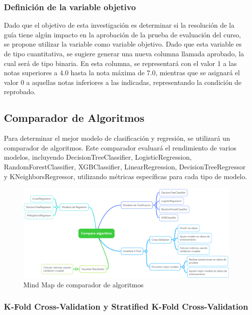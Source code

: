 \subsubsection{Definición de la variable objetivo}

Dado que el objetivo de esta investigación es determinar si la resolución de la guía tiene algún impacto en la aprobación de la prueba de evaluación del curso, se propone utilizar la variable  como variable objetivo. Dado que esta variable es de tipo cuantitativa, se sugiere generar una nueva columna llamada aprobado, la cual será de tipo binaria. En esta columna, se representará con el valor 1 a las notas superiores a 4.0 hasta la nota máxima de 7.0, mientras que se asignará el valor 0 a aquellas notas inferiores a las indicadas, representando la condición de reprobado.

\subsection{Comparador de Algoritmos}

Para determinar el mejor modelo de clasificación y regresión, se utilizará un comparador de algoritmos. Este comparador evaluará el rendimiento de varios modelos, incluyendo DecisionTreeClassifier, LogisticRegression, RandomForestClassifier, XGBClassifier, LinearRegression, DecisionTreeRegressor y KNeighborsRegressor, utilizando métricas específicas para cada tipo de modelo.

\begin{figure}[H]
  \centering
  \includegraphics[width=1\textwidth]{img/compara_algoritmos/comparaAlgoritmoCompletoMindMap.png}
  \caption{Mind Map de comparador de algoritmos}
  \label{fig:mindMap_comparaAlgoritmos}
\end{figure}

\subsubsection{K-Fold Cross-Validation y Stratified K-Fold Cross-Validation}

